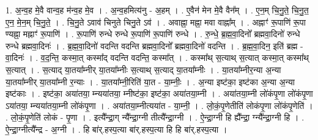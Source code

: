 \documentclass[17pt]{extarticle}
\begin{document}
1. अ॒न्व॒ह मे॒वै वान्व॒ह म॑न्व॒ह मे॒व । . अ॒न्व॒हमित्य॑नु - अ॒हम् । . ए॒वैन॑ मेन मे॒वै वैन᳚म् । . ए॒न॒म् चि॒नु॒ते॒ चि॒नु॒त॒ ए॒न॒ मे॒न॒म् चि॒नु॒ते॒ । . चि॒नु॒ते ऽवाव॑ चिनुते चिनु॒ते ऽव॑ । . अवाह्ना॒ मह्ना॒ मवा वाह्ना᳚म् । . अह्नाꣳ॑ रू॒पाणि॑ रू॒पा ण्यह्ना॒ मह्नाꣳ॑ रू॒पाणि॑ । . रू॒पाणि॑ रुन्धे रुन्धे रू॒पाणि॑ रू॒पाणि॑ रुन्धे । . रु॒न्धे॒ ब्र॒ह्म॒वा॒दिनो᳚ ब्रह्मवा॒दिनो॑ रुन्धे रुन्धे ब्रह्मवा॒दिनः॑ । . ब्र॒ह्म॒वा॒दिनो॑ वदन्ति वदन्ति ब्रह्मवा॒दिनो᳚ ब्रह्मवा॒दिनो॑ वदन्ति । . ब्र॒ह्म॒वा॒दिन॒ इति॑ ब्रह्म - वा॒दिनः॑ । . व॒द॒न्ति॒ कस्मा॒त् कस्मा᳚द् वदन्ति वदन्ति॒ कस्मा᳚त् । . कस्मा᳚थ् स॒त्याथ् स॒त्यात् कस्मा॒त् कस्मा᳚थ् स॒त्यात् । . स॒त्याद् या॒तया᳚म्नीर् या॒तया᳚म्नीः स॒त्याथ् स॒त्याद् या॒तया᳚म्नीः । . या॒तया᳚म्नीर॒न्या अ॒न्या या॒तया᳚म्नीर् या॒तया᳚म्नी र॒न्याः । . या॒तया᳚म्नी॒रिति॑ या॒त - या॒म्नीः॒ । . अ॒न्या इष्ट॑का॒ इष्ट॑का अ॒न्या अ॒न्या इष्ट॑काः । . इष्ट॑का॒ अया॑तया॒ म्न्यया॑तया॒ म्नीष्ट॑का॒ इष्ट॑का॒ अया॑तया॒म्नी । . अया॑तया॒म्नी लो॑कंपृ॒णा लो॑कंपृ॒णा ऽया॑तया॒ म्न्यया॑तया॒म्नी लो॑कंपृ॒णा । . अया॑तया॒म्नीत्यया॑त - या॒म्नी॒ । . लो॒कं॒पृ॒णेतीति॑ लोकंपृ॒णा लो॑कंपृ॒णेति॑ । . लो॒कं॒पृ॒णेति॑ लोकं - पृ॒णा । . इत्यै᳚न्द्रा॒ग् न्यै᳚न्द्रा॒ग्नी तीत्यै᳚न्द्रा॒ग्नी । . ऐ॒न्द्रा॒ग्नी हि ह्यै᳚न्द्रा॒ ग्न्यै᳚न्द्रा॒ग्नी हि । . ऐ॒न्द्रा॒ग्नीत्यै᳚न्द्र - अ॒ग्नी । . हि बा॑र्.हस्प॒त्या बा॑र्.हस्प॒त्या हि हि बा॑र्.हस्प॒त्या । \newline
\end{document}
